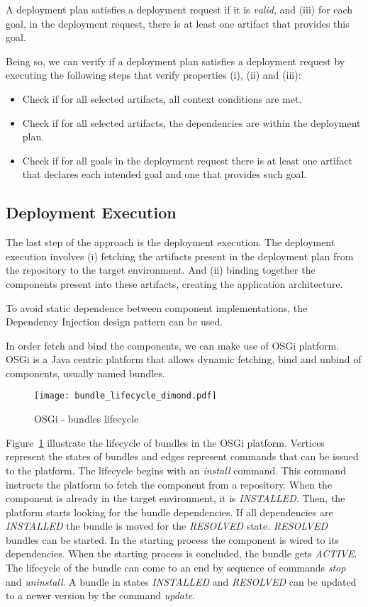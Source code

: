 A deployment plan satisfies a deployment request if it is \emph{valid}, and (iii) for each goal, in the deployment request, there is at least one artifact that provides this goal.

Being so, we can verify if a deployment plan satisfies a deployment request by executing the following steps that verify properties (i), (ii) and (iii):

\begin{itemize}
  \item Check if for all selected artifacts, all context conditions are met.
  \item Check if for all selected artifacts, the dependencies are within the deployment plan.
  \item Check if for all goals in the deployment request there is at least one artifact that declares each intended goal and one that provides such goal.
\end{itemize}

\subsection{Deployment Execution}

The last step of the approach is the deployment execution. The deployment execution involves (i) fetching the artifacts present in the deployment plan from the repository to the target environment. And (ii) binding together the components present into these artifacts, creating the application architecture.

To avoid static dependence between component implementations, the Dependency Injection\cite{fowler_inversion_2004} design pattern can be used.

In order fetch and bind the components, we can make use of OSGi platform\cite{the_osgi_alliance_osgi_2007}. OSGi is a Java centric platform that allows dynamic fetching, bind and unbind of components, usually named bundles.

\begin{figure}[!htb]
  \centering
  \texttt{[image: bundle\_lifecycle\_dimond.pdf]}
  \caption{OSGi - bundles lifecycle}
  \label{fig:osgi_bundles}
\end{figure}

Figure~\ref{fig:osgi_bundles} illustrate the lifecycle of bundles in the OSGi platform. Vertices represent the states of bundles and edges represent commands that can be issued to the platform.
The lifecycle begins with an \emph{install} command. This command instructs the platform to fetch the component from a repository. When the component is already in the target environment, it is \emph{INSTALLED}. Then, the platform starts looking for the bundle dependencies. If all dependencies are \emph{INSTALLED} the bundle is moved for the \emph{RESOLVED} state. \emph{RESOLVED} bundles can be started. In the starting process the component is wired to its dependencies. When the starting process is concluded, the bundle gets \emph{ACTIVE}. The lifecycle of the bundle can come to an end by sequence of commands \emph{stop} and \emph{uninstall}. A bundle in states \emph{INSTALLED} and \emph{RESOLVED} can be updated to a newer version by the command \emph{update}.
